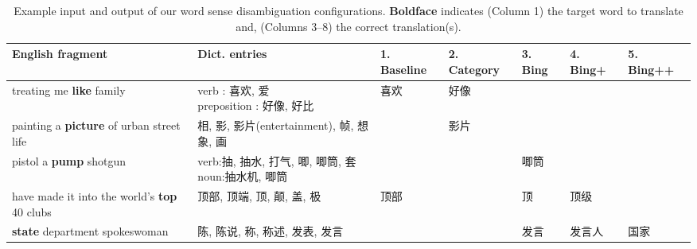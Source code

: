 \begin{CJK}{UTF8}{gbsn}
\begin{table*}[t]
  \caption{Example input and output of our word sense disambiguation configurations. {\bf Boldface} indicates (Column 1) the target word to translate and, (Columns 3--8) the correct translation(s).}
  \label{table:wsd_1}
  \small
  \begin{center}
  \begin{tabular}{| p{2.8cm} | p{3.7cm} | p{1.2cm} | p{1.2cm}| p{1.2cm} | p{1.2cm} | p{1.2cm} |}
    \hline
    English fragment & Dict. entries & 1. Baseline & 2. Category & 3. Bing & 4. Bing+ & 5. Bing++ \\
    \hline
     treating me {\bf like} family  & \parbox[t]{3.4cm}{verb : 喜欢, 爱\\preposition : 好像, 好比 } & 喜欢 & 好像 & & & \\
    \hline
     painting a {\bf picture} of urban street life  & \parbox[t]{3.4cm}{ 相, 影, 影片(entertainment), 帧, 想象, 画 } & & 影片 & & & \\
    \hline
     pistol a {\bf pump} shotgun  & \parbox[t]{3.4cm}{verb:抽, 抽水, 打气, 唧, 唧筒, 套\\ noun:抽水机, 唧筒} & & & 唧筒 & & \\
    \hline
     have made it into the world's {\bf top} 40 clubs  & \parbox[t]{3.4cm}{顶部, 顶端, 顶, 颠, 盖, 极 } & 顶部 &  & 顶 & 顶级 & \\
    \hline
    {\bf state} department spokeswoman  & \parbox[t]{3.4cm}{陈, 陈说, 称, 称述, 发表, 发言} & & & 发言 & 发言人 & 国家 \\
    \hline
  \end{tabular}
  \end{center}
\end{table*}




\end{CJK}
